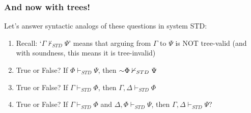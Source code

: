 \begin{frame}
\frametitle{And now with trees!}

Let's answer syntactic analogs of these questions in system STD:

\medskip 

\begin{enumerate}[<+->]

\item[] Recall: `$\Gamma \nvdash_{STD} \Psi$' means that arguing from $\Gamma$ to $\Psi$ is NOT tree-valid (and with soundness, this means it is tree-invalid)

\item True or False? If $\Phi \vdash_{STD} \Psi$, then $\enot \Phi \nvdash_{STD} \Psi$ 

\bigskip


\item True or False? If $\Gamma \vdash_{STD} \Phi$, then $\Gamma, \Delta \vdash_{STD} \Phi$

\item True or False? If $\Gamma \vdash_{STD} \Phi$ and $\Delta, \Phi \vdash_{STD} \Psi$, then $\Gamma, \Delta \vdash_{STD} \Psi$? 

\iffalse

Argument:

By the first assumption in the antecedent, there is a tree with root Gamma and not Phi, such that it closes.
Gamma
not Phi
closes

By the second assumption, there is a tree with root Delta, Phi, and NOT psi such that it also closes
1. Delta
2. Phi
3. Not Psi
closes

Now, consider a tree that has root Gamma, Delta, and not Psi:
1. Gamma
2. Delta
3. not Psi
Ask: does this necessarily close? 

Cheeky argument: note that adding a tautology to the premises does not change anything.
So add the premise Phi or not Phi to the root
resolve this sentence first.
Then, on the Phi branch, repeat the tree from the second assumption (using Delta and Not Psi and Phi), and so this necessarily closes

on the not-phi branch, we can repeat the tree from the first assumption, using Gamma and not phi, so this also closes. 

so both branches close, so the tree closes 

\fi 
\end{enumerate}

\end{frame}

